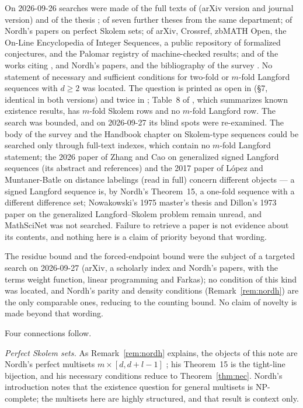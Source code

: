 \documentclass[11pt]{amsart}
\theoremstyle{plain}
\theoremstyle{definition}
\theoremstyle{remark}
\begin{document}
On 2026-09-26 searches were made of the full texts of \cite{ADH} (arXiv version and
journal version) and of the thesis \cite{Alk}; of seven further theses from the same
department; of Nordh's papers on perfect Skolem sets; of arXiv, Crossref, zbMATH Open,
the On-Line Encyclopedia of Integer Sequences, a public repository of formalized
conjectures, and the Palomar registry of machine-checked results; and of the works citing
\cite{ADH}, \cite{BNSS} and Nordh's papers, and the bibliography of the survey
\cite{FM}. No statement of necessary and sufficient conditions for two-fold or $m$-fold
Langford sequences with $d \ge 2$ was located. The question is printed as open in
\cite{ADH} (\S7, identical in both versions) and twice in \cite{Alk}; Table~8 of
\cite{ADH}, which summarizes known existence results, has $m$-fold Skolem rows and no
$m$-fold Langford row. The search was bounded, and on 2026-09-27 its blind spots were
re-examined. The body of the survey \cite{FM} and the Handbook chapter on Skolem-type
sequences could be searched only through full-text indexes, which contain no $m$-fold
Langford statement; the 2026 paper of Zhang and Cao on generalized signed Langford
sequences (its abstract and references) and the 2017 paper of L\'opez and Muntaner-Batle on
distance labelings (read in full) concern different objects --- a signed Langford
sequence is, by Nordh's Theorem~15, a one-fold sequence with a different difference set;
Nowakowski's 1975 master's thesis and Dillon's 1973 paper on the generalized
Langford--Skolem problem remain unread, and MathSciNet was not searched. Failure to
retrieve a paper is not evidence about its contents, and nothing here is a claim of
priority beyond that wording.

The residue bound and the forced-endpoint bound were the subject of a targeted search on
2026-09-27 (arXiv, a scholarly index and Nordh's papers, with the terms weight function,
linear programming and Farkas); no condition of this kind was located, and Nordh's parity and density
conditions (Remark~\ref{rem:nordh}) are the only comparable ones, reducing to the
counting bound. No claim of novelty is made beyond that wording.

Four connections follow.

\emph{Perfect Skolem sets.} As Remark~\ref{rem:nordh} explains, the objects of this
note are Nordh's perfect multisets $m \times [d,d+l-1]$ \cite{Nordh}; his Theorem~15 is
the tight-line bijection, and his necessary conditions reduce to Theorem~\ref{thm:nec}.
Nordh's introduction notes that the existence question for general multisets is NP-complete; the multisets here are highly
structured, and that result is context only.
\end{document}
